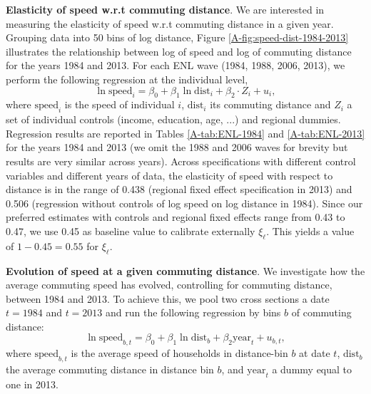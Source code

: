 \documentclass[11pt]{report}
\newcommand{\ENL}{../../output/CASD/2021-03-31/ENL}
\begin{document}
\noindent \textbf{Elasticity of speed w.r.t commuting distance}. We are interested in measuring the elasticity of speed w.r.t commuting distance in a given year. Grouping data into 50 bins of log distance, Figure \ref{A-fig:speed-dist-1984-2013} illustrates the relationship between log of speed and log of commuting distance for the years 1984 and 2013. For each ENL wave (1984, 1988, 2006, 2013), we perform the following regression at the individual level,
\begin{equation*}
\ln \text{speed}_{i} = \beta_0 + \beta_1 \ln \text{dist}_{i} + \beta_2 \cdot Z_{i} + u_{i},
\end{equation*}
where $\text{speed}_{i}$ is the speed of individual $i$, $\text{dist}_{i}$ its commuting distance and $Z_{i}$ a set of individual controls (income, education, age, ...) and regional dummies. 
Regression results are reported in Tables \ref{A-tab:ENL-1984} and \ref{A-tab:ENL-2013} for the years 1984 and 2013 (we omit the 1988 and 2006 waves for brevity but results are very similar across years). Across specifications with different control variables and different years of data, the elasticity of speed with respect to distance is in the range of 0.438 (regional fixed effect specification in 2013) and 0.506
(regression without controls of log speed on log distance in 1984). Since our preferred estimates with controls and regional fixed effects range from 0.43 to 0.47, we use 0.45 as baseline value to calibrate externally $\xi_\ell$. This yields a value of $1-0.45=0.55$ for $\xi_\ell$.





%







\noindent \textbf{Evolution of speed at a given commuting distance}. We investigate how the average commuting speed has evolved, controlling for commuting distance, between 1984
and 2013. To achieve this, we pool two cross sections a date $t=1984$ and $t=2013$ and run the following regression by bins $b$ of commuting distance:
\begin{equation*}
\ln \text{speed}_{b,t} = \beta_0 + \beta_1 \ln \text{dist}_{b} + \beta_2 \text{year}_{t} + u_{b,t},
\end{equation*}
where $\text{speed}_{b,t}$ is the average speed of households in distance-bin $b$ at date $t$, $\text{dist}_{b}$ the average commuting distance in distance bin $b$, and $\text{year}_{t}$ a dummy equal to one in 2013. 
\end{document}
